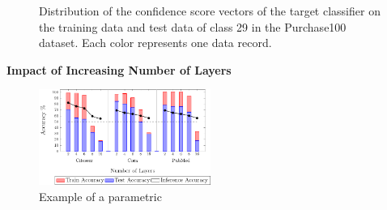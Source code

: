\begin{figure}
\begin{minipage}[b]{1\linewidth}
    \end{minipage}
    \caption{Distribution of the confidence score vectors of the target classifier on the training data and test data of class 29 in the Purchase100 dataset. Each color represents one data record.}
    \label{fig:soft_label}
\end{figure}


\textbf{Impact of Increasing Number of Layers}

\begin{figure}[!htb]
\centering
\includegraphics[width=0.5\textwidth]{./figures/BBMIA/gsage_numlayers.pdf}
\caption{Example of a parametric}
\end{figure}


